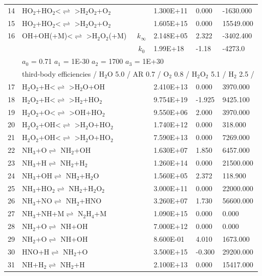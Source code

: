 \documentclass[11pt]{article}
\begin{document}
\begin{table}[hbt]
\begin{tabular}{|r l c l l l|}
14 &	HO$_{2}$+HO$_{2}$<$\rightleftharpoons$ >H$_{2}$O$_{2}$+O$_{2}$&	&	1.300E+11&	0.000&	-1630.000\\ 
15 &	HO$_{2}$+HO$_{2}$<$\rightleftharpoons$ >H$_{2}$O$_{2}$+O$_{2}$&	&	1.605E+15&	0.000&	15549.000\\ 
16 &	OH+OH(+M)<$\rightleftharpoons$ >H$_{2}$O$_{2}$(+M)&	$k_{\infty}$&	2.148E+05&	2.322&	-3402.400\\ 
	&	&	$k_0$&	1.99E+18&-1.18&	-4273.0\\ 
	&\multicolumn{5}{l|}{	$a_0$ = 0.71	$a_1$ = 1E-30	$a_2$ = 1700	$a_3$ = 1E+30}\\ 
	&\multicolumn{5}{l|}{third-body efficiencies  / H$_{2}$O 5.0 / AR 0.7 / O$_{2}$ 0.8 / H$_{2}$O$_{2}$ 5.1 / H$_{2}$ 2.5 /}\\ 
17 &	H$_{2}$O$_{2}$+H<$\rightleftharpoons$ >H$_{2}$O+OH&	&	2.410E+13&	0.000&	3970.000\\ 
18 &	H$_{2}$O$_{2}$+H<$\rightleftharpoons$ >H$_{2}$+HO$_{2}$&	&	9.754E+19&	-1.925&	9425.100\\ 
19 &	H$_{2}$O$_{2}$+O<$\rightleftharpoons$ >OH+HO$_{2}$&	&	9.550E+06&	2.000&	3970.000\\ 
20 &	H$_{2}$O$_{2}$+OH<$\rightleftharpoons$ >H$_{2}$O+HO$_{2}$&	&	1.740E+12&	0.000&	318.000\\ 
21 &	H$_{2}$O$_{2}$+OH<$\rightleftharpoons$ >H$_{2}$O+HO$_{2}$&	&	7.590E+13&	0.000&	7269.000\\ 
22 &	NH$_{3}$+O$\rightleftharpoons$ NH$_{2}$+OH&	&	1.630E+07&	1.850&	6457.000\\ 
23 &	NH$_{3}$+H$\rightleftharpoons$ NH$_{2}$+H$_{2}$&	&	1.260E+14&	0.000&	21500.000\\ 
24 &	NH$_{3}$+OH$\rightleftharpoons$ NH$_{2}$+H$_{2}$O&	&	1.560E+05&	2.372&	118.900\\ 
25 &	NH$_{3}$+HO$_{2}$$\rightleftharpoons$ NH$_{2}$+H$_{2}$O$_{2}$&	&	3.000E+11&	0.000&	22000.000\\ 
26 &	NH$_{3}$+NO$\rightleftharpoons$ NH$_{2}$+HNO&	&	3.260E+07&	1.730&	56600.000\\ 
27 &	NH$_{3}$+NH+M$\rightleftharpoons$ N$_{2}$H$_{4}$+M&	&	1.090E+15&	0.000&	0.000\\ 
28 &	NH$_{2}$+O$\rightleftharpoons$ NH+OH&	&	7.000E+12&	0.000&	0.000\\ 
29 &	NH$_{2}$+O$\rightleftharpoons$ NH+OH&	&	8.600E-01&	4.010&	1673.000\\ 
30 &	HNO+H$\rightleftharpoons$ NH$_{2}$+O&	&	3.500E+15&	-0.300&	29200.000\\ 
31 &	NH+H$_{2}$$\rightleftharpoons$ NH$_{2}$+H&	&	2.100E+13&	0.000&	15417.000\\ 

\end{tabular}
\end{table}
\end{document}
